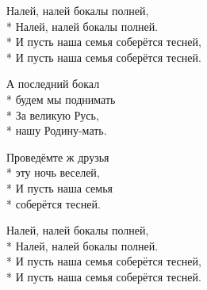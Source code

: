 \medskip

\begin{minipage}{\linewidth}
\hspace*{1.5em}Налей, налей бокалы полней,\\*
\hspace*{1.5em}Налей, налей бокалы полней.\\*
\hspace*{1.5em}И пусть наша семья соберётся тесней,\\*
\hspace*{1.5em}И пусть наша семья соберётся тесней.\\
\end{minipage}\par\medskip\nobreak

\medskip

\begin{minipage}{\linewidth}
А последний бокал\\*
будем мы поднимать\\*
За великую Русь,\\*
нашу Родину-мать.\\
\end{minipage}\par\medskip\nobreak

\medskip

\begin{minipage}{\linewidth}
Проведёмте ж друзья\\*
эту ночь веселей,\\*
И пусть наша семья\\*
соберётся тесней.\\
\end{minipage}\par\medskip\nobreak

\medskip

\begin{minipage}{\linewidth}
\hspace*{1.5em}Налей, налей бокалы полней,\\*
\hspace*{1.5em}Налей, налей бокалы полней.\\*
\hspace*{1.5em}И пусть наша семья соберётся тесней,\\*
\hspace*{1.5em}И пусть наша семья соберётся тесней.\\
\end{minipage}

\vspace{\fill}\newpage

